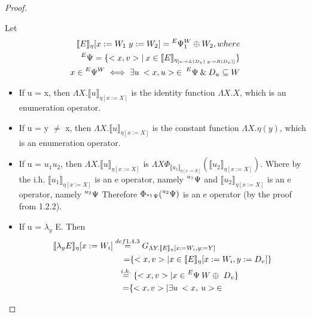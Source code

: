 \documentclass{article}
\begin{document}
\begin{proof}
\begin{enumerate}
 				Let 
				\begin{equation*}
				\begin{split}
					\llbracket E \rrbracket_\eta[x := W_1\; y := W_2]
					= \prescript{E}{}{\Psi}{}{}^W_1 \oplus W_2, where\\
					\prescript{E}{}{\Psi}{}{} = \{<x, v> |\:x \in 
					\llbracket E \rrbracket_{\eta_{
					[x := L(D_v)\; y := R(D_v)]}}\}\\
					x \in \prescript{E}{}{\Psi}{}{}^W \iff \exists u \: 
					<x, u>\:\in\:\prescript{E}{}{\Psi}{}{}\:\&\: 
					D_u \subseteq W
				\end{split}
				\end{equation*}
				\begin{itemize}
  				\item If u = x, then 
					$\Lambda X. \llbracket u \rrbracket_{\eta [x := X]}$
					is the identity function $\Lambda X. X$, which is 
					an enumeration operator.
  				\item If u = y $\neq$ x, then 
					$\Lambda X. \llbracket u \rrbracket_{\eta [x := X]}$
					is the constant function $\Lambda X. \eta(y)$, which
					is an enumeration operator.
  				\item If u = $u_1 u_2$, then
					$\Lambda X. \llbracket u \rrbracket_{\eta [x := X]}$
					is $\Lambda X \Phi_{\llbracket u_1 \rrbracket_{\eta 
					[x := X]}} (\llbracket u_2 \rrbracket_{\eta 
					[x := X]})$. Where by the i.h. 
					$\llbracket u_1 \rrbracket_{\eta [x := X]}$
					is an e operator, namely
					$\prescript{u_1}{}{\Psi}{}{}$
					and 
					$\llbracket u_2 \rrbracket_{\eta [x := X]}$
					is an e operator, namely 
					$\prescript{u_2}{}{\Psi}{}{}$
					Therefore $\Phi_{\prescript{u_1}{}{\Psi}{}{}} 										(\prescript{u_2}{}{\Psi}{}{})$ is an e operator
					(by the proof from 1.2.2).
  				\item If u = $\lambda_y$ E.
				Then
				\begin{equation*}
				\begin{split}
					\llbracket \lambda_y E \rrbracket_\eta{ [x := W_i]}
					&\stackrel{def 1.4.3}{=}
					G_{\Lambda Y. \llbracket E \rrbracket_\eta
					{[x := W_i, y:= Y]}} \\
					&\quad\;{=}
					\{<x, v> | x \in 
					\llbracket E \rrbracket_\eta {[x := W_i, y:= D_v]}\}\\
					&\:\,\;\stackrel{i.h.}{=}
					\{<x, v> | x \in 
					\prescript{E}{}{\Psi}{}{} \: W \oplus\ D_v\}\\
					&\quad\,{=}
					\{<x, v> | \exists u \:	<x,\:u>\:\in\:

\end{split}
\end{equation*}
\end{itemize}
\end{enumerate}
\end{proof}
\end{document}
